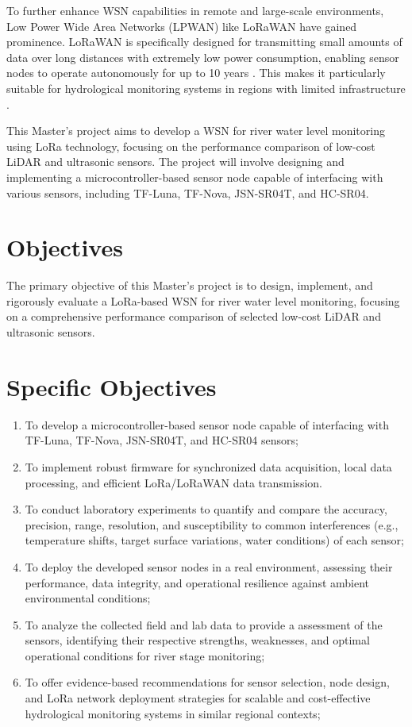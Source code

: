 To further enhance WSN capabilities in remote and large-scale environments, Low Power Wide Area Networks (LPWAN) like LoRaWAN have gained prominence. LoRaWAN is specifically designed for transmitting small amounts of data over long distances with extremely low power consumption, enabling sensor nodes to operate autonomously for up to 10 years . This makes it particularly suitable for hydrological monitoring systems in regions with limited infrastructure \cite{pule_2017_wireless, chen_2013_natural,ferreira_2023_conception}. 

This Master's project aims to develop a WSN for river water level monitoring using LoRa technology, focusing on the performance comparison of low-cost LiDAR and ultrasonic sensors. The project will involve designing and implementing a microcontroller-based sensor node capable of interfacing with various sensors, including TF-Luna, TF-Nova, JSN-SR04T, and HC-SR04.

\section{Objectives}

The primary objective of this Master's project is to design, implement, and rigorously evaluate a LoRa-based WSN for river water level monitoring, focusing on a comprehensive performance comparison of selected low-cost LiDAR and ultrasonic sensors.

\section{Specific Objectives}

\begin{enumerate}
    \item To develop a microcontroller-based sensor node capable of interfacing with TF-Luna, TF-Nova, JSN-SR04T, and HC-SR04 sensors;
    \item To implement robust firmware for synchronized data acquisition, local data processing, and efficient LoRa/LoRaWAN data transmission.
    \item To conduct laboratory experiments to quantify and compare the accuracy, precision, range, resolution, and susceptibility to common interferences (e.g., temperature shifts, target surface variations, water conditions) of each sensor;
    \item To deploy the developed sensor nodes in a real environment, assessing their performance, data integrity, and operational resilience against ambient environmental conditions;
    \item To analyze the collected field and lab data to provide a assessment of the sensors, identifying their respective strengths, weaknesses, and optimal operational conditions for river stage monitoring;
    \item To offer evidence-based recommendations for sensor selection, node design, and LoRa network deployment strategies for scalable and cost-effective hydrological monitoring systems in similar regional contexts;
\end{enumerate}

